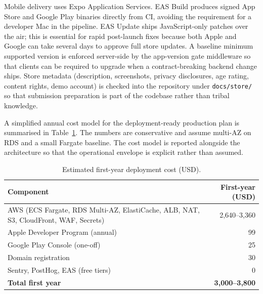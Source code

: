 Mobile delivery uses Expo Application Services. EAS Build produces signed App Store and Google Play binaries directly from CI, avoiding the requirement for a developer Mac in the pipeline. EAS Update ships JavaScript-only patches over the air; this is essential for rapid post-launch fixes because both Apple and Google can take several days to approve full store updates. A baseline minimum supported version is enforced server-side by the app-version gate middleware so that clients can be required to upgrade when a contract-breaking backend change ships. Store metadata (description, screenshots, privacy disclosures, age rating, content rights, demo account) is checked into the repository under \texttt{docs/store/} so that submission preparation is part of the codebase rather than tribal knowledge.

A simplified annual cost model for the deployment-ready production plan is summarised in Table~\ref{tab:cost}. The numbers are conservative and assume multi-AZ on RDS and a small Fargate baseline. The cost model is reported alongside the architecture so that the operational envelope is explicit rather than assumed.

\begin{table}[H]
\centering
\small
\caption{Estimated first-year deployment cost (USD).}
\label{tab:cost}
\begin{tabular}{|p{11cm}|r|}
\hline
Component & First-year (USD) \\
\hline
AWS (ECS Fargate, RDS Multi-AZ, ElastiCache, ALB, NAT, S3, CloudFront, WAF, Secrets) & 2{,}640--3{,}360 \\
Apple Developer Program (annual) & 99 \\
Google Play Console (one-off) & 25 \\
Domain registration & 30 \\
Sentry, PostHog, EAS (free tiers) & 0 \\
\hline
\textbf{Total first year} & \textbf{3{,}000--3{,}800} \\
\hline
\end{tabular}
\end{table}

\clearpage

